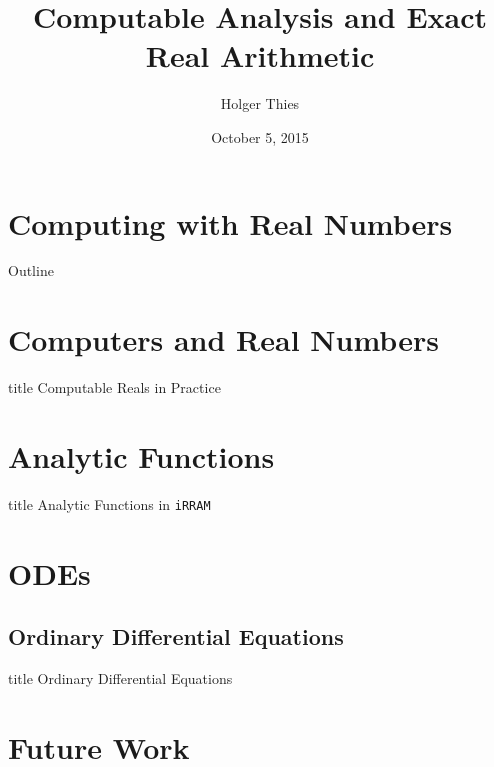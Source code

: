 \documentclass[handout,xcolor=pdftex,dvipsnames,table]{beamer}
\title[Computable Analysis, Exact Arithmetic]{Computable Analysis and Exact Real Arithmetic}
\author[ H. Thies]{
		Holger Thies 
}
\institute[Graco Seminar]{
  Graco Seminar
}
\newcommand{\irram}{\texttt{iRRAM}\xspace}
\begin{document}
\date{October 5, 2015}
\frame{
\titlepage
}
\section{Computing with Real Numbers}
\begin{frame}[t]{Outline}
 \tableofcontents 
\end{frame}


\section{Computers and Real Numbers}
\begin{frame}
	\begin{beamercolorbox}[sep=8pt,center,shadow=true,rounded=true]{title}
	Computable Reals in Practice\par%
    \end{beamercolorbox}
\vfill
\end{frame}

\section{Analytic Functions}
\begin{frame}
	\begin{beamercolorbox}[sep=8pt,center,shadow=true,rounded=true]{title}
	Analytic Functions in \irram \par%
    \end{beamercolorbox}
\vfill
\end{frame}



\section{ODEs}
\subsection*{Ordinary Differential Equations}
\begin{frame}
	\begin{beamercolorbox}[sep=8pt,center,shadow=true,rounded=true]{title}
	Ordinary Differential Equations\par%
    \end{beamercolorbox}
\vfill
\end{frame}

\section*{Future Work}

\end{document}

